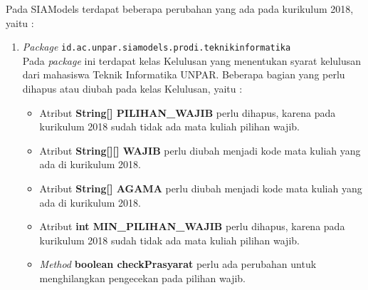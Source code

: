 Pada SIAModels terdapat beberapa perubahan yang ada pada kurikulum 2018, yaitu :
\begin{enumerate}
	\item \textit{Package} \texttt{id.ac.unpar.siamodels.prodi.teknikinformatika}\\
	Pada \textit{package} ini terdapat kelas Kelulusan yang menentukan syarat kelulusan dari mahasiswa Teknik Informatika UNPAR. Beberapa bagian yang perlu dihapus atau diubah pada kelas Kelulusan, yaitu :
	\begin{itemize}
		\item Atribut \textbf{String[] PILIHAN\_WAJIB} perlu dihapus, karena pada kurikulum 2018 sudah tidak ada mata kuliah pilihan wajib.
		\item Atribut \textbf{String[][] WAJIB} perlu diubah menjadi kode mata kuliah yang ada di kurikulum 2018.
		\item Atribut \textbf{String[] AGAMA} perlu diubah menjadi kode mata kuliah yang ada di kurikulum 2018.
		\item Atribut \textbf{int MIN\_PILIHAN\_WAJIB} perlu dihapus, karena pada kurikulum 2018 sudah tidak ada mata kuliah pilihan wajib.
		\item \textit{Method} \textbf{boolean checkPrasyarat} perlu ada perubahan untuk menghilangkan pengecekan pada pilihan wajib.
	\end{itemize}
		

\end{enumerate}
